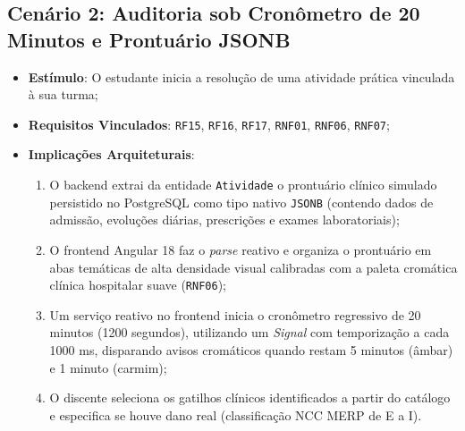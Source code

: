 \subsection{Cenário 2: Auditoria sob Cronômetro de 20 Minutos e Prontuário JSONB}
\label{subsec_cenario_auditoria}
\begin{itemize}
    \item \textbf{Estímulo}: O estudante inicia a resolução de uma atividade prática vinculada à sua turma;
    \item \textbf{Requisitos Vinculados}: \texttt{RF15}, \texttt{RF16}, \texttt{RF17}, \texttt{RNF01}, \texttt{RNF06}, \texttt{RNF07};
    \item \textbf{Implicações Arquiteturais}:
    \begin{enumerate}
        \item O backend extrai da entidade \texttt{Atividade} o prontuário clínico simulado persistido no PostgreSQL como tipo nativo \texttt{JSONB} (contendo dados de admissão, evoluções diárias, prescrições e exames laboratoriais);
        \item O frontend Angular 18 faz o \textit{parse} reativo e organiza o prontuário em abas temáticas de alta densidade visual calibradas com a paleta cromática clínica hospitalar suave (\texttt{RNF06});
        \item Um serviço reativo no frontend inicia o cronômetro regressivo de 20 minutos (1200 segundos), utilizando um \textit{Signal} com temporização a cada 1000 ms, disparando avisos cromáticos quando restam 5 minutos (âmbar) e 1 minuto (carmim);
        \item O discente seleciona os gatilhos clínicos identificados a partir do catálogo e especifica se houve dano real (classificação NCC MERP de E a I).
    \end{enumerate}
\end{itemize}

